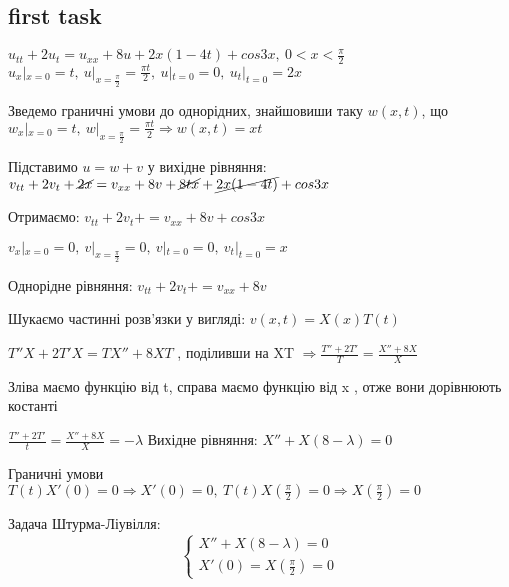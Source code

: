 
\subsection{first task}

\begin{tcolorbox}[title=Task1]
    \begin{center}
        $ u_{tt} + 2u_t = u_{xx} + 8 u + 2x(1-4t) + cos3x,\ 0<x<\frac{\pi}{2} $ \\
        $ u_x |_{x=0}=t,\ u|_{x=\frac{\pi}{2}} = \frac{\pi t}{2},\ u|_{t=0} = 0, \ u_t|_{t = 0} = 2x  $
    \end{center}
\end{tcolorbox}



\begin{center}
    Зведемо граничні умови до однорідних, знайшовиши таку $ w(x,t) $, що 
    $ w_x |_{x=0}=t,\ w|_{x=\frac{\pi}{2}} = \frac{\pi t}{2} \Rightarrow w(x,t)=xt $ 


    Підставимо $ u = w + v$ у вихідне рівняння: 
    $ v_{tt} +2v_t + \cancel{2x} = v_{xx} + 8v + \cancel{8tx} + \cancel{2x(1 - 4t)} +cos3x $


    Отримаємо: $ v_{tt} +2v_t + = v_{xx} + 8v + cos3x $ 


    $ v_x |_{x=0}=0,\ v|_{x=\frac{\pi}{2}} = 0,\ v|_{t=0} = 0, \ v_t|_{t = 0} = x  $ 


    Однорідне рівняння:
    $ v_{tt} +2v_t + = v_{xx} + 8v $


    Шукаємо частинні розв'язки у вигляді: $ v(x,t) = X(x)T(t) $  


    $ T''X + 2T'X = TX'' +8XT $
    , поділивши на XT  $\Rightarrow \frac{T'' + 2T'}{T} = \frac{X'' +8X}{X} $


    Зліва маємо функцію від t, справа маємо функцію від x , отже вони дорівнюють костанті  


    $\frac{T'' + 2T'}{t} = \frac{X'' +8X}{X}  = -\lambda$
    Вихідне рівняння: 
    $ X''+ X(8-\lambda) = 0 $  


    Граничні умови
    $ T(t)X'(0)=0 \Rightarrow X'(0)=0,\ T(t)X(\frac{\pi}{2})=0 \Rightarrow X(\frac{\pi}{2}) = 0 $


    Задача Штурма-Ліувілля:
    \begin{equation}
        \begin{cases}
        X''+ X(8-\lambda) = 0\\ 
        X'(0)=X(\frac{\pi}{2}) = 0
        \end{cases}
        \label{Shturm1}
    \end{equation} 



\end{center}
